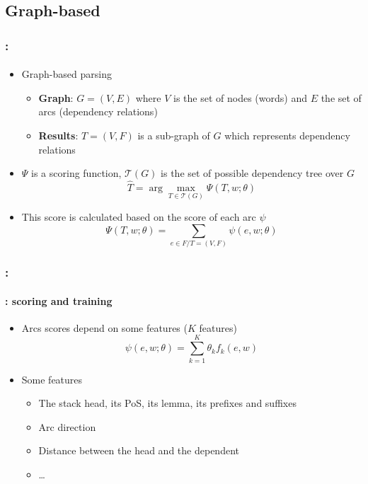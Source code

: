 \documentclass[xcolor=table]{beamer}
\begin{document}
\begin{frame}
\end{frame}

\subsection{Graph-based}

\begin{frame}
	\frametitle{\insertshortsubtitle: \insertsection}
	\framesubtitle{\insertsubsection}

	\begin{minipage}{.6\textwidth}
		\begin{itemize}
			\item Graph-based parsing
			\begin{itemize}
				\item \textbf{Graph}: $G = (V, E)$ where $V$ is the set of nodes (words) and $E$ the set of arcs (dependency relations)
				\item \textbf{Results}: $T = (V, F)$ is a sub-graph of $G$ which represents dependency relations
			\end{itemize}
		\end{itemize}
	\end{minipage}
	\begin{minipage}{.38\textwidth}
	\end{minipage}
	
	\begin{itemize}
		\item $\Psi$ is a scoring function, $ \mathcal{T}(G) $ is the set of possible dependency tree over $G$
		\[ \hat{T} = \arg\max\limits_{T \in \mathcal{T}(G)} \Psi(T, w; \theta) \]
		\item This score is calculated based on the score of each arc $\psi$
		\[ \Psi(T, w; \theta) = \sum_{e \in F / T = (V, F)} \psi(e, w; \theta) \]
	\end{itemize}

\end{frame}

\begin{frame}
	\frametitle{\insertshortsubtitle: \insertsection}
	\framesubtitle{\insertsubsection: scoring and training}

	\begin{itemize}
		\item Arcs scores depend on some features ($K$ features)
		\[ \psi(e, w; \theta) = \sum_{k = 1}^{K} \theta_k f_k(e, w)  \]
		
		\item Some features
		\begin{itemize}
			\item The stack head, its PoS, its lemma, its prefixes and suffixes
			\item Arc direction
			\item Distance between the head and the dependent
			\item \ldots
		\end{itemize}	
	\end{itemize}

\end{frame}
\end{document}
